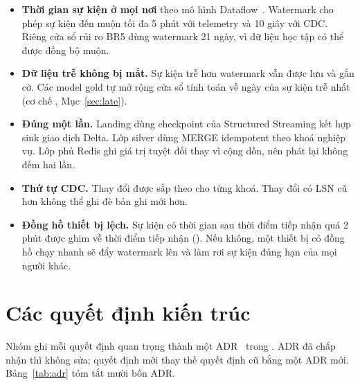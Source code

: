 \begin{itemize}
  \item \textbf{Thời gian sự kiện ở mọi nơi} theo mô hình Dataflow~\cite{akidau2015dataflow}. Watermark cho phép sự kiện đến muộn tối đa 5 phút với telemetry và 10 giây với CDC. Riêng cửa sổ rủi ro BR5 dùng watermark 21 ngày, vì dữ liệu học tập có thể được đồng bộ muộn.
  \item \textbf{Dữ liệu trễ không bị mất.} Sự kiện trễ hơn watermark vẫn được lưu và gắn cờ. Các model gold tự mở rộng cửa sổ tính toán về ngày của sự kiện trễ nhất (cơ chế , Mục~\ref{sec:late}).
  \item \textbf{Đúng một lần.} Landing dùng checkpoint của Structured Streaming kết hợp sink giao dịch Delta. Lớp silver dùng MERGE idempotent theo khoá nghiệp vụ. Lớp phủ Redis ghi giá trị tuyệt đối thay vì cộng dồn, nên phát lại không đếm hai lần.
  \item \textbf{Thứ tự CDC.} Thay đổi được sắp theo  cho từng khoá. Thay đổi có LSN cũ hơn không thể ghi đè bản ghi mới hơn.
  \item \textbf{Đồng hồ thiết bị lệch.} Sự kiện có thời gian sau thời điểm tiếp nhận quá 2 phút được ghim về thời điểm tiếp nhận (). Nếu không, một thiết bị có đồng hồ chạy nhanh sẽ đẩy watermark lên và làm rơi sự kiện đúng hạn của mọi người khác.
\end{itemize}

\section{Các quyết định kiến trúc}

Nhóm ghi mỗi quyết định quan trọng thành một ADR~\cite{nygard2011adr} trong . ADR đã chấp nhận thì không sửa; quyết định mới thay thế quyết định cũ bằng một ADR mới. Bảng~\ref{tab:adr} tóm tắt mười bốn ADR.

